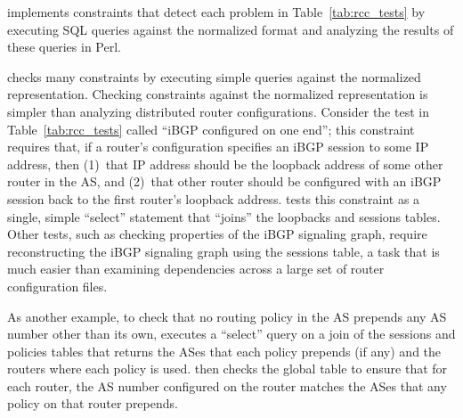 \rcc implements constraints that detect each problem in
Table~\ref{tab:rcc_tests} by executing SQL queries against the
normalized format and analyzing the results of these queries in Perl.

\rcc checks many constraints by executing simple queries against the
normalized representation.  Checking constraints against the normalized
representation is simpler than analyzing distributed router
configurations.  Consider the test in Table~\ref{tab:rcc_tests} called
``iBGP 
configured on one end''; this constraint requires that, if a router's
configuration specifies an iBGP session to some IP address, then
(1)~that IP address should be the loopback address of some other router
in the AS, and (2)~that other router should be configured with an iBGP
session back to the first router's loopback address.  \rcc tests this
constraint as a single, simple ``select'' statement that ``joins'' the
{\tf loopbacks} and {\tf sessions} tables.  Other tests, such as
checking properties of the iBGP signaling graph, require reconstructing
the iBGP signaling graph using the {\tf sessions} table, a task that is
much easier than examining dependencies across a large set of router
configuration files.

As another example, to check that no
routing policy in the AS prepends any AS number other than its own, \rcc
executes a ``select'' 
query on a join of the {\tf sessions} and {\tf policies} tables that
returns the ASes that each policy prepends (if any) and the routers
where each policy is used. \rcc then checks the {\tf global} table to
ensure that for each router, the AS number configured on the router
matches the ASes that any policy on that router prepends.
